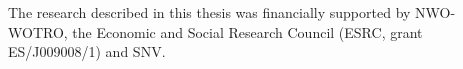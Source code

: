 \noindent
The research described in this thesis was financially supported by NWO-WOTRO, the Economic and Social Research Council (ESRC, grant ES/J009008/1) and SNV.